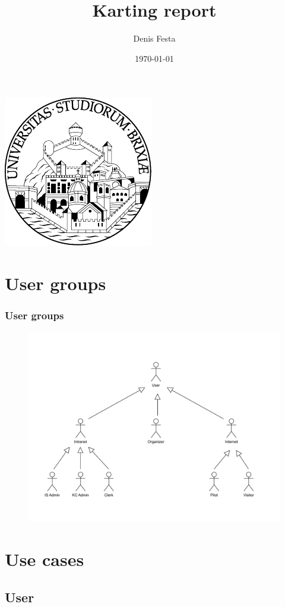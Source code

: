 \documentclass{beamer}
\title{Karting report}
\author{Denis Festa}
\date{\today}
\begin{document}
\begin{frame}
    \titlepage
    \centering
    \includegraphics[width=0.2\linewidth]{unibs-circ-logo.pdf}
\end{frame}



\section*{User groups}

\begin{frame}
\frametitle{User groups}
\begin{figure}
    \centering
    \includegraphics[width=0.8\linewidth]{drawio/users-uc.pdf}
\end{figure}
\end{frame}

\section*{Use cases}

\subsection*{User}
\end{document}
